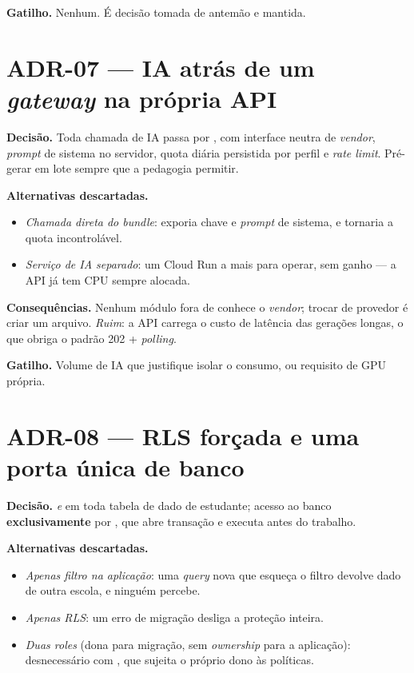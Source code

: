 \textbf{Gatilho.} Nenhum. É decisão tomada de antemão e mantida.

\section{ADR-07 --- IA atrás de um \emph{gateway} na própria API}

\textbf{Decisão.} Toda chamada de IA passa por , com
interface neutra de \emph{vendor}, \emph{prompt} de sistema no servidor, quota
diária persistida por perfil e \emph{rate limit}. Pré-gerar em lote sempre que a
pedagogia permitir.

\textbf{Alternativas descartadas.}
\begin{itemize}
  \item \emph{Chamada direta do \emph{bundle}}: exporia chave e \emph{prompt} de
    sistema, e tornaria a quota incontrolável.
  \item \emph{Serviço de IA separado}: um Cloud Run a mais para operar, sem
    ganho --- a API já tem CPU sempre alocada.
\end{itemize}

\textbf{Consequências.} Nenhum módulo fora de  conhece o
\emph{vendor}; trocar de provedor é criar um arquivo. \emph{Ruim}: a API carrega o
custo de latência das gerações longas, o que obriga o padrão 202 +
\emph{polling}.

\textbf{Gatilho.} Volume de IA que justifique isolar o consumo, ou requisito de
GPU própria.

\section{ADR-08 --- RLS forçada e uma porta única de banco}

\textbf{Decisão.}  \emph{e}  em toda
tabela de dado de estudante; acesso ao banco \textbf{exclusivamente} por
, que abre transação e executa
 antes do trabalho.

\textbf{Alternativas descartadas.}
\begin{itemize}
  \item \emph{Apenas filtro na aplicação}: uma \emph{query} nova que esqueça o
    filtro devolve dado de outra escola, e ninguém percebe.
  \item \emph{Apenas RLS}: um erro de migração desliga a proteção inteira.
  \item \emph{Duas \emph{roles}} (dona para migração, sem \emph{ownership} para a
    aplicação): desnecessário com , que sujeita o próprio dono às
    políticas.
\end{itemize}

